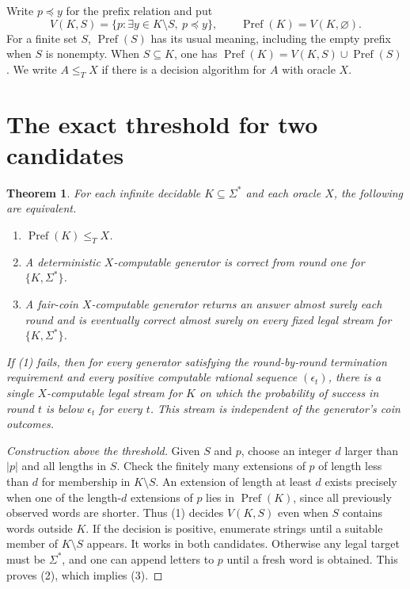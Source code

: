 \documentclass[11pt]{article}
\newtheorem{theorem}{Theorem}
\newcommand{\Pref}{\operatorname{Pref}}
\newcommand{\Full}{\Sigma^*}
\begin{document}
Write $p\preceq y$ for the prefix relation and put
\[
 V(K,S)=\{p:\exists y\in K\setminus S,\ p\preceq y\},\qquad \Pref(K)=V(K,\varnothing).
\]
For a finite set $S$, $\Pref(S)$ has its usual meaning, including the empty prefix when $S$ is nonempty. When $S\subseteq K$, one has $\Pref(K)=V(K,S)\cup\Pref(S)$. We write $A\le_T X$ if there is a decision algorithm for $A$ with oracle $X$.

\section{The exact threshold for two candidates}
\begin{theorem}\label{pair}
For each infinite decidable $K\subseteq\Full$ and each oracle $X$, the following are equivalent.
\begin{enumerate}
\item $\Pref(K)\le_T X$.
\item A deterministic $X$-computable generator is correct from round one for $\{K,\Full\}$.
\item A fair-coin $X$-computable generator returns an answer almost surely each round and is eventually correct almost surely on every fixed legal stream for $\{K,\Full\}$.
\end{enumerate}
If (1) fails, then for every generator satisfying the round-by-round termination requirement and every positive computable rational sequence $(\epsilon_t)$, there is a single $X$-computable legal stream for $K$ on which the probability of success in round $t$ is below $\epsilon_t$ for every $t$. This stream is independent of the generator's coin outcomes.
\end{theorem}

\begin{proof}[Construction above the threshold]
Given $S$ and $p$, choose an integer $d$ larger than $|p|$ and all lengths in $S$. Check the finitely many extensions of $p$ of length less than $d$ for membership in $K\setminus S$. An extension of length at least $d$ exists precisely when one of the length-$d$ extensions of $p$ lies in $\Pref(K)$, since all previously observed words are shorter. Thus (1) decides $V(K,S)$ even when $S$ contains words outside $K$. If the decision is positive, enumerate strings until a suitable member of $K\setminus S$ appears. It works in both candidates. Otherwise any legal target must be $\Full$, and one can append letters to $p$ until a fresh word is obtained. This proves (2), which implies (3).
\end{proof}
\end{document}
